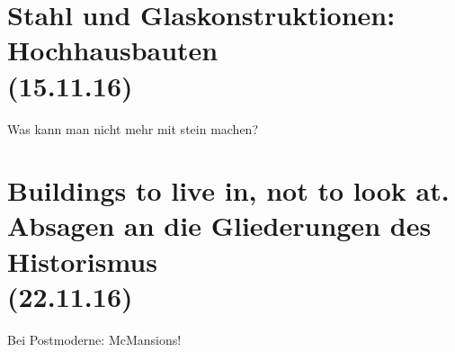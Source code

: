 \documentclass[emulatestandardclasses]{scrartcl}
\begin{document}
\section{Stahl und Glaskonstruktionen: Hochhausbauten\\(15.11.16)}


Was kann man nicht mehr mit stein machen?

\section{Buildings to live in, not to look at. Absagen an die Gliederungen des Historismus\\(22.11.16)}

Bei Postmoderne: McMansions!

%
\end{document}

